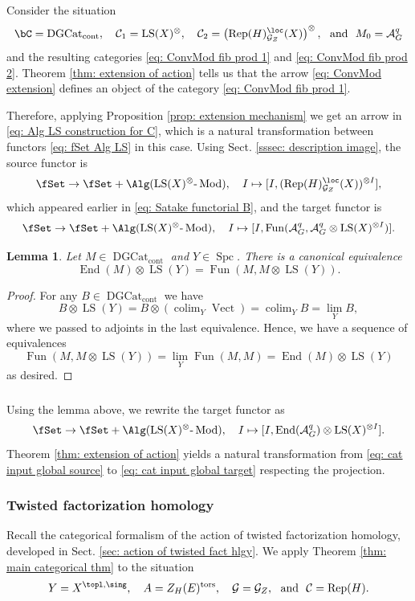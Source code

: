 \documentclass[10pt]{amsart}
\newcommand{\sssec}{\subsubsection}
\newtheorem{lemma}[subsubsection]{Lemma}
\theoremstyle{remark}
\newcommand{\te}{\text}
\newcommand{\on}{\operatorname}
\newcommand{\cA}{\mathcal{A}}
\newcommand{\cC}{\mathcal{C}}
\newcommand{\cG}{\mathcal{G}}
\newcommand{\DGcat}{\on{DGCat}_{\on{cont}}}
\newcommand{\lMod}{\text{-}\on{Mod}}
\newcommand{\Rep}{\on{Rep}}
\newcommand{\Vect}{\on{Vect}}
\newcommand{\LS}{\on{LS}}
\newcommand{\Spc}{\on{Spc}}
\DeclareMathOperator{\End}{End}
\newcommand{\Fun}{\on{Fun}}
\DeclareMathOperator{\colim}{colim}
\begin{document}
Consider the situation
\[\bC= \DGcat,\quad \cC_1=\LS(X)^{\otimes},\quad \cC_2=\left(\Rep(H)^{\loc}_{\cG_Z}(X)\right)^{\otimes},\ \te{ and }\ M_0=\cA^q_G\]
and the resulting categories \eqref{eq: ConvMod fib prod 1} and \eqref{eq: ConvMod fib prod 2}. Theorem \ref{thm: extension of action} tells us that the arrow \eqref{eq: ConvMod extension} defines an object of the category \eqref{eq: ConvMod fib prod 1}.
\medskip

Therefore, applying Proposition \ref{prop: extension mechanism} we get an arrow in \eqref{eq: Alg LS construction for C}, which is a natural transformation between functors \eqref{eq: fSet Alg LS} in this case. Using Sect. \ref{sssec: description image}, the source functor is 
\begin{equation}\label{eq: cat input global source}
    \fSet\rightarrow\fSet+\Alg(\LS(X)^{\otimes}\lMod),\quad I\mapsto [I, (\Rep(H)^{\loc}_{\cG_Z}(X))^{\otimes I}],
\end{equation}
which appeared earlier in \eqref{eq: Satake functorial B}, and the target functor is
\[\fSet\rightarrow\fSet+\Alg(\LS(X)^{\otimes}\lMod),\quad I\mapsto [I, \Fun(\cA^q_G,\cA^q_G\otimes\LS(X)^{\otimes I})].\]

\begin{lemma}\label{lem: LS lin endo}
    Let $M\in\DGcat$ and $Y\in\Spc$. There is a canonical equivalence
    \[\End(M)\otimes\LS(Y)= \Fun(M,M\otimes\LS(Y)).\]
\end{lemma}
\begin{proof}
    For any $B\in\DGcat$ we have
    \[B\otimes \LS(Y)=B\otimes (\colim_Y \Vect) = \colim_Y B =\lim_Y B,\]
    where we passed to adjoints in the last equivalence. Hence, we have a sequence of equivalences
    \[\Fun(M,M\otimes\LS(Y))=\lim_Y \Fun(M, M) = \End(M)\otimes\LS(Y)\]
    as desired.    
\end{proof}

\sssec{}\label{sssec: cat input global}
Using the lemma above, we rewrite the target functor as
\begin{equation}\label{eq: cat input global target}
    \fSet\rightarrow\fSet+\Alg(\LS(X)^{\otimes}\lMod),\quad I\mapsto [I, \End(\cA^q_G)\otimes\LS(X)^{\otimes I}].
\end{equation}
Theorem \ref{thm: extension of action} yields a natural transformation from \eqref{eq: cat input global source} to \eqref{eq: cat input global target} respecting the projection.


\sssec{Twisted factorization homology}\label{sssec: applying twfact}
Recall the categorical formalism of the action of twisted factorization homology, developed in Sect. \ref{sec: action of twisted fact hlgy}.  We apply Theorem \ref{thm: main categorical thm} to the situation
\[Y=X^{\topl,\sing},\quad A=Z_H(E)^{\on{tors}}, \quad \cG=\cG_Z, \ \te{ and } \ \cC=\Rep(H).\]
\end{document}

